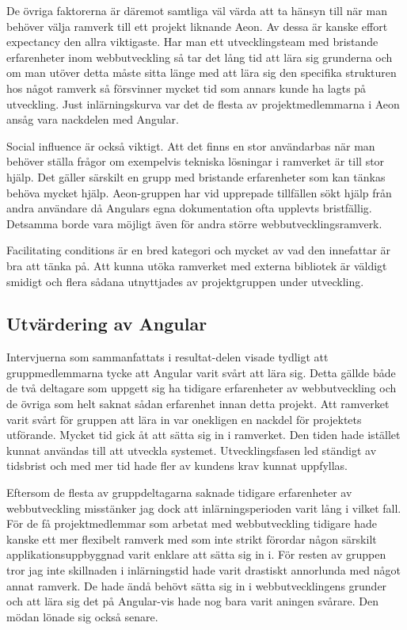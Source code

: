 De övriga faktorerna är däremot samtliga väl värda att ta hänsyn till när man behöver välja ramverk till ett projekt liknande Aeon. Av dessa är kanske effort expectancy den allra viktigaste. Har man ett utvecklingsteam med bristande erfarenheter inom webbutveckling så tar det lång tid att lära sig grunderna och om man utöver detta måste sitta länge med att lära sig den specifika strukturen hos något ramverk så försvinner mycket tid som annars kunde ha lagts på utveckling. Just inlärningskurva var det de flesta av projektmedlemmarna i Aeon ansåg vara nackdelen med Angular.

Social influence är också viktigt. Att det finns en stor användarbas när man behöver ställa frågor om exempelvis tekniska lösningar i ramverket är till stor hjälp. Det gäller särskilt en grupp med bristande erfarenheter som kan tänkas behöva mycket hjälp. Aeon-gruppen har vid upprepade tillfällen sökt hjälp från andra användare då Angulars egna dokumentation ofta upplevts bristfällig. Detsamma borde vara möjligt även för andra större webbutvecklingsramverk.

Facilitating conditions är en bred kategori och mycket av vad den innefattar är bra att tänka på. Att kunna utöka ramverket med externa bibliotek är väldigt smidigt och flera sådana utnyttjades av projektgruppen under utveckling. 




\subsection{Utvärdering av Angular}

Intervjuerna som sammanfattats i resultat-delen visade tydligt att gruppmedlemmarna tycke att Angular varit svårt att lära sig. Detta gällde både de två deltagare som uppgett sig ha tidigare erfarenheter av webbutveckling och de övriga som helt saknat sådan erfarenhet innan detta projekt. Att ramverket varit svårt för gruppen att lära in var onekligen en nackdel för projektets utförande. Mycket tid gick åt att sätta sig in i ramverket. Den tiden hade istället kunnat användas till att utveckla systemet. Utvecklingsfasen led ständigt av tidsbrist och med mer tid hade fler av kundens krav kunnat uppfyllas.

Eftersom de flesta av gruppdeltagarna saknade tidigare erfarenheter av webbutveckling misstänker jag dock att inlärningsperioden varit lång i vilket fall. För de få projektmedlemmar som arbetat med webbutveckling tidigare hade kanske ett mer flexibelt ramverk med som inte strikt förordar någon särskilt applikationsuppbyggnad varit enklare att sätta sig in i. För resten av gruppen tror jag inte skillnaden i inlärningstid hade varit drastiskt annorlunda med något annat ramverk. De hade ändå behövt sätta sig in i webbutvecklingens grunder och att lära sig det på Angular-vis hade nog bara varit aningen svårare. Den mödan lönade sig också senare.

